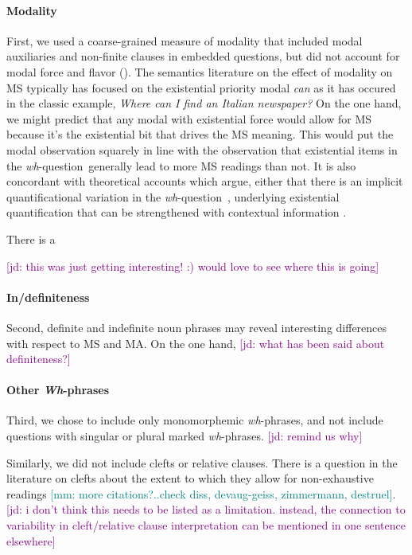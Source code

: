 \documentclass[12pt,letterpaper,table,svgnames,dvipsnames]{article}
\newcommand{\jd}[1]{\textcolor{Purple}{[jd: #1]}}
\newcommand{\mm}[1]{\textcolor{teal}{[mm: #1]}}
\newcommand{\whq}{\emph{wh}-question~}
\begin{document}
\paragraph{Modality}
First, we used a coarse-grained measure of modality that included  modal auxiliaries and  non-finite clauses in embedded questions, but did not account for modal force and flavor (\cite{kratzer1981,kratzer1991,portner2009}). The semantics literature on the effect of modality on MS typically has focused on the existential priority modal \emph{can} as it has occured in the classic example, \emph{Where can I find an Italian newspaper?} On the one hand, we might predict that any modal with existential force would allow for MS because it's the existential bit that drives the MS meaning. This would put the modal observation squarely in line with the observation that existential items in the \whq generally lead to more MS readings than not. It is also concordant with theoretical accounts which argue, either that there is an implicit quantificational variation in the \whq \cite{hintikka1976,lahiri2002}, underlying existential quantification that can be strengthened with contextual information \cite{asherlascarides1998}.


There is a 

\jd{this was just getting interesting! :) would love to see where this is going}

\paragraph{In/definiteness}
Second, definite and indefinite noun phrases may reveal interesting differences with respect to MS and MA. On the one hand, \jd{what has been said about definiteness?}

\paragraph{Other \emph{Wh}-phrases}
Third, we chose to include only monomorphemic \emph{wh}-phrases, and not include questions with singular or plural marked \emph{wh}-phrases. \jd{remind us why} 

Similarly, we did not include clefts or relative clauses. There is a question in the literature on clefts about the extent to which they allow for non-exhaustive readings \mm{more citations?..check diss, devaug-geiss, zimmermann, destruel}. \jd{i don't think this needs to be listed as a limitation. instead, the connection to variability in cleft/relative clause interpretation can be mentioned in one sentence elsewhere}
\end{document}
